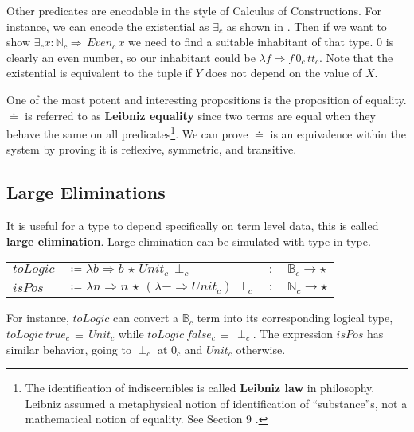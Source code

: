 Other predicates are encodable in the style of Calculus of Constructions\cite{10.1016/0890-5401(88)90005-3}.
For instance, we can encode the existential as $\exists_{c}$ as shown in .
Then if we want to show $\exists_{c}x:\mathbb{N}_{c}\Rightarrow\,Even_{c}\,x$ we need to find a suitable inhabitant of that type.
$0$ is clearly an even number, so our inhabitant could be $\lambda f\Rightarrow f\,0_{c}\,tt_{c}$.
Note that the existential is equivalent to the tuple if $Y$ does not depend on the value of $X$.

One of the most potent and interesting propositions is the proposition of equality.
$\doteq$ is referred to as \textbf{Leibniz equality} since two terms are equal when they behave the same on all predicates\footnote{
  The identification of indiscernibles is called \textbf{Leibniz law} in philosophy.
  Leibniz assumed a metaphysical notion of identification of ``substance''s, not a mathematical notion of equality.
  See Section 9 \cite{Leibniz1686}.}.
We can prove $\doteq$ is an equivalence within the system by proving it is reflexive, symmetric, and transitive.

\subsection{Large Eliminations}


It is useful for a type to depend specifically on term level data, this is called \textbf{large elimination}.
Large elimination can be simulated with type-in-type.

\begin{tabular}{llll}
  $toLogic$ & $\coloneqq\lambda b\Rightarrow b\,\star\,Unit_{c}\,\perp_{c}$ & $:$ & $\mathbb{B}_{c}\rightarrow\star$\tabularnewline
  $isPos$ & $\coloneqq\lambda n\Rightarrow n\,\star\,(\lambda-\Rightarrow Unit_{c})\,\perp_{c}$ & $:$ & $\mathbb{N}_{c}\rightarrow\star$\tabularnewline
\end{tabular}
  
For instance, $toLogic$ can convert a $\mathbb{B}_{c}$ term into its corresponding logical type, $toLogic\ true_{c}\,\equiv\, Unit_{c}$ while $toLogic\ false_{c}\, \equiv\, \perp_{c}$.
The expression $isPos$ has similar behavior, going to $\perp_{c}$ at $0_{c}$ and $Unit_{c}$ otherwise.


